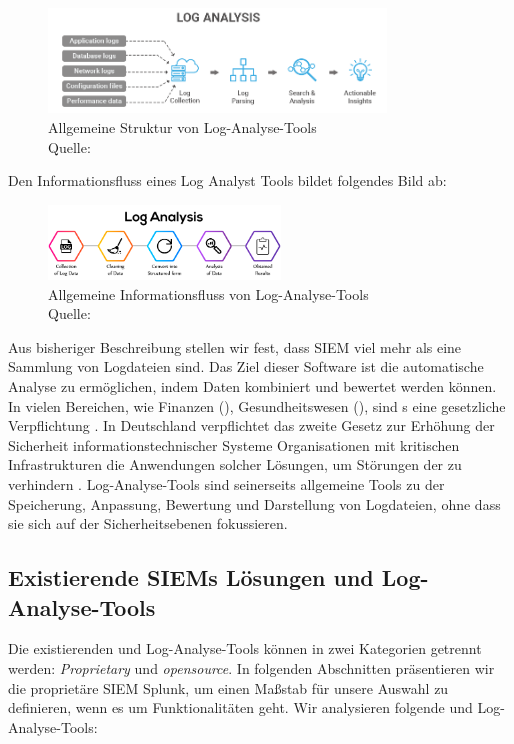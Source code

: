 \begin{figure}[H]
   \centering
   \includegraphics[width=0.8\textwidth]{assets/2.1_p2.png}
   \caption[Allgemeine Struktur von Log-Analyse-Tools]
   {Allgemeine Struktur von Log-Analyse-Tools\\Quelle: \citep{Tek-Tools_LGTArchitektur} }
   \centering
\end{figure}

Den Informationsfluss eines Log Analyst Tools bildet folgendes Bild ab:

\begin{figure}[H]
   \centering
   \includegraphics[width=0.55\textwidth]{assets/2.2_p2.png}
   \caption[Allgemeine Informationsfluss von Log-Analyse-Tools]
   {Allgemeine Informationsfluss von Log-Analyse-Tools\\Quelle: \citep{Neptune_LATInfoFluss} }
   \centering
\end{figure}

Aus bisheriger Beschreibung stellen wir fest, dass \gls{SIEM} viel mehr als eine Sammlung von Logdateien sind. Das Ziel dieser Software ist die automatische Analyse zu ermöglichen, indem Daten kombiniert und bewertet werden können. In vielen Bereichen, wie Finanzen (), Gesundheitswesen (), sind s eine gesetzliche Verpflichtung \citep{Jog_SIEM}. In Deutschland verpflichtet das zweite Gesetz zur Erhöhung der Sicherheit informationstechnischer Systeme Organisationen mit kritischen Infrastrukturen die Anwendungen solcher Lösungen, um Störungen der  zu verhindern \citep{BSI_ITSG}. Log-Analyse-Tools sind seinerseits allgemeine Tools zu der Speicherung, Anpassung, Bewertung und Darstellung von Logdateien, ohne dass sie sich auf der Sicherheitsebenen fokussieren.


\subsection{Existierende SIEMs Lösungen und Log-Analyse-Tools}
Die existierenden  und Log-Analyse-Tools können in zwei Kategorien getrennt werden: \textit{\gls{Proprietary}} und  \textit{\gls{opensource}}. In folgenden Abschnitten präsentieren wir die proprietäre \gls{SIEM} Splunk, um einen Maßstab für unsere Auswahl zu definieren, wenn es um Funktionalitäten geht. Wir analysieren folgende  und Log-Analyse-Tools: 

